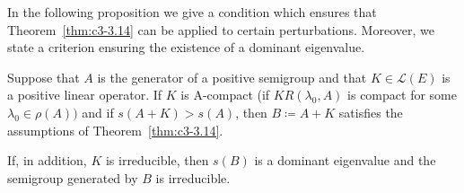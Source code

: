 In the following proposition we give a condition which ensures that Theorem~\ref{thm:c3-3.14} can be applied to certain perturbations. 
Moreover, we state a criterion ensuring the existence of a dominant eigenvalue.
\begin{proposition}\label{prop:c3-3.18}
	Suppose that $A$ is the generator of a positive semigroup and that $K \in \mathcal{L}(E)$ is a positive linear operator.
	If\/ $K$ is A-compact (\ie  if\/ $KR(\lambda_{0},A)$ is compact for some $\lambda_{0} \in \rho(A))$ and if\/ $s(A+K) > s(A)$, then $B \coloneqq  A + K$ satisfies the assumptions of Theorem~\ref{thm:c3-3.14}.
	
	If, in addition, $K$ is irreducible, then $s(B)$ is a dominant eigenvalue and the semigroup generated by $B$ is irreducible.
\end{proposition}
